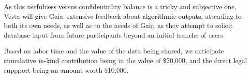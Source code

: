\documentclass{vestaletter}
\def\BidderShort{Gaia}
\begin{document}
As this usefulness versus confidentiality balance is a tricky and subjective one, Vesta will give \BidderShort\ extensive feedback about algorithmic outputs, attending to both its own needs, as well as to the needs of \BidderShort\ as they attempt to solicit database input from future participants beyond an initial tranche of users.

Based on labor time and the value of the data being shared, we anticipate cumulative in-kind contribution being in the value of \$20,000, and the direct legal suppport being an amount worth \$10,000.
\end{document}
